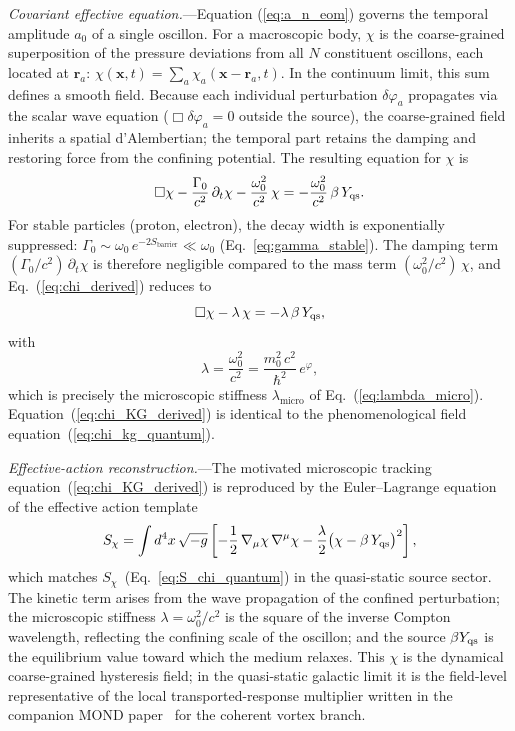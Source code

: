 \documentclass[aps,prd,onecolumn,superscriptaddress,nofootinbib,showpacs,12pt,notitlepage]{revtex4-2}
\begin{document}
\textit{Covariant effective equation.}---Equation
(\ref{eq:a_n_eom}) governs the temporal amplitude $a_0$
of a single oscillon.  For a macroscopic body, $\chi$ is
the coarse-grained superposition of the pressure
deviations from all $N$ constituent oscillons,
each located at $\mathbf{r}_a$:
$\chi(\mathbf{x},t)
= \sum_a \chi_a(\mathbf{x} - \mathbf{r}_a, t)$.
In the continuum limit, this sum defines a smooth field.
Because each individual perturbation $\delta\varphi_a$
propagates via the scalar wave equation
($\Box\delta\varphi_a = 0$ outside the source), the
coarse-grained field inherits a spatial d'Alembertian;
the temporal part retains the damping and restoring
force from the confining potential.  The resulting
equation for $\chi$ is
\begin{equation}\label{eq:chi_derived}
  \Box\chi
  - \frac{\Gamma_0}{c^2}\,\partial_t\chi
  - \frac{\omega_0^2}{c^2}\,\chi
  = -\frac{\omega_0^2}{c^2}\,\beta\,Y_{\rm qs}.
\end{equation}
For stable particles (proton, electron), the decay width
is exponentially suppressed:
$\Gamma_0 \sim \omega_0\,e^{-2S_{\mathrm{barrier}}} \ll
\omega_0$ (Eq.~\ref{eq:gamma_stable}).  The damping term
$(\Gamma_0/c^2)\,\partial_t\chi$ is therefore negligible
compared to the mass term
$(\omega_0^2/c^2)\,\chi$, and
Eq.~(\ref{eq:chi_derived}) reduces to
\begin{equation}\label{eq:chi_KG_derived}
  \Box\chi - \lambda\,\chi
  = -\lambda\,\beta\,Y_{\rm qs},
\end{equation}
with
\begin{equation}\label{eq:lambda_derived}
  \lambda
  = \frac{\omega_0^2}{c^2}
  = \frac{m_0^2\,c^2}{\hbar^2}\,e^{\varphi},
\end{equation}
which is precisely the microscopic stiffness
$\lambda_{\mathrm{micro}}$ of
Eq.~(\ref{eq:lambda_micro}).
Equation~(\ref{eq:chi_KG_derived}) is identical to
the phenomenological field
equation~(\ref{eq:chi_kg_quantum}).

\textit{Effective-action reconstruction.}---The motivated
microscopic tracking equation~(\ref{eq:chi_KG_derived}) is reproduced
by the Euler--Lagrange equation of the effective action template
\begin{equation}\label{eq:S_chi_derived}
  S_\chi = \int d^4x\,\sqrt{-g}\left[
    -\frac{1}{2}\,\nabla_\mu\chi\,\nabla^\mu\chi
    - \frac{\lambda}{2}\bigl(\chi - \beta\,Y_{\rm qs}\bigr)^2
  \right],
\end{equation}
which matches $S_\chi$~(Eq.~\ref{eq:S_chi_quantum})
in the quasi-static source sector.  The kinetic term arises from the
wave propagation of the confined perturbation; the microscopic stiffness
$\lambda = \omega_0^2/c^2$ is the square of the inverse
Compton wavelength, reflecting the confining scale of
the oscillon; and the source $\beta Y_{\rm qs}$ is the equilibrium
value toward which the medium relaxes.
This $\chi$ is the dynamical coarse-grained hysteresis field; in the quasi-static galactic limit it is the field-level representative of the local transported-response multiplier written in the companion MOND paper~\cite{Lotishvili2026MOND} for the coherent vortex branch.
\end{document}
